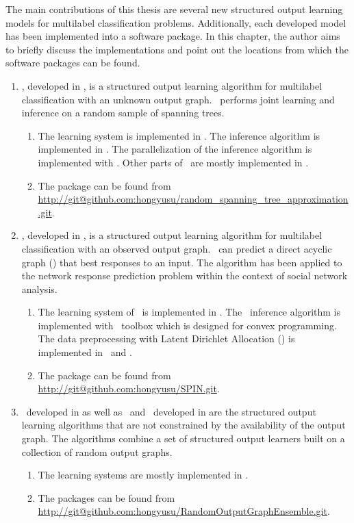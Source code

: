 {The main contributions of this thesis are several new structured output learning models for multilabel classification problems.
Additionally, each developed model has been implemented into a software package.
In this chapter, the author aims to briefly discuss the implementations and point out the locations from which the software packages can be found.

\begin{enumerate}
	\item \rta, developed in , is a structured output learning algorithm for multilabel classification with an unknown output graph. \rta\ performs joint learning and inference on a random sample of spanning trees.
	\begin{enumerate}
		\item The learning system is implemented in \matlab. The inference algorithm is implemented in \cpp. The parallelization of the inference algorithm is implemented with \openmp. Other parts of \rta\ are mostly implemented in \matlab.
		\item The package can be found from \url{http://git@github.com:hongyusu/random_spanning_tree_approximation.git}.
	\end{enumerate}
	
	\item \spin, developed in , is a structured output learning algorithm for multilabel classification with an observed output graph. \spin\ can predict a direct acyclic graph (\daggraph) that best responses to an input. The algorithm has been applied to the network response prediction problem within the context of social network analysis.
	\begin{enumerate}
		\item The learning system of \spin\ is implemented in \matlab. The \sdp\ inference algorithm is implemented with \cvx\ toolbox which is designed for convex programming. The data preprocessing with Latent Dirichlet Allocation (\lda) \citep{Blei03latent} is implemented in \python\ and \matlab.
		\item The package can be found from \url{http://git@github.com:hongyusu/SPIN.git}.
	\end{enumerate}
	
	\item \mve\ developed in  as well as \amm\ and \mam\ developed in  are the structured output learning algorithms that are not constrained by the availability of the output graph. The algorithms combine a set of structured output learners built on a collection of random output graphs.
	\begin{enumerate}
		\item The learning systems are mostly implemented in \matlab.
		\item The packages can be found from \url{http://git@github.com:hongyusu/RandomOutputGraphEnsemble.git}.
	\end{enumerate}
\end{enumerate}




}
